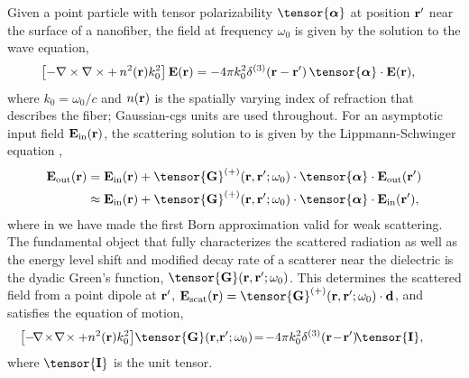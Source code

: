 \documentclass[aps,pra,twocolumn]{revtex4-1} %
\newcommand{\inp}{{\rm in}}
\newcommand{\out}{{\rm out}}
\newcommand{\unittens}{\tensor{\mathbf{I}}}
\begin{document}
Given a point particle with tensor polarizability $\tensor{\boldsymbol{\alpha}}$ at position $\mathbf{r}'$ near the surface of a nanofiber, the field  at frequency $\omega_0$ is given by the solution to the wave equation, 
	\begin{align}\label{Eq::WaveEquationSource}
		\left[ - \nabla\times\nabla\times + \, n^2(\br)k_0^2 \right] \mathbf{E}(\br) &= -4\pi  k_0^2 \delta^{(3)}(\br-\br')\,  \tensor{\boldsymbol{\alpha}}\cdot \mathbf{E}(\br),
	\end{align}
where $k_0=\omega_0/c$ and $n(\mathbf{r})$ is the spatially varying index of refraction that describes the fiber; Gaussian-cgs units are used throughout.  
For an asymptotic input field $\mathbf{E}_{\inp}(\br)$, the scattering solution to  is given by the Lippmann-Schwinger equation \cite{wubs_multiple-scattering_2004},
	\begin{align}
		\mathbf{E}_{\out}(\br) &=\mathbf{E}_{\inp}(\br)+\tensor{\mathbf{G}}^{(+)}(\br , \br'; \omega_0)\cdot 
\tensor{\boldsymbol{\alpha}}\cdot \mathbf{E}_{\out}(\br')\\
		&\approx \mathbf{E}_{\inp}(\br)+ \tensor{\mathbf{G}}^{(+)}(\br , \br'; \omega_0) \cdot 
\tensor{\boldsymbol{\alpha}}\cdot \mathbf{E}_{\inp}(\br'), \label{Eq::ScatteredField}
	\end{align}
where in  we have made the first Born approximation valid for weak scattering. The fundamental object that fully characterizes the scattered radiation as well as the energy level shift and modified decay rate of a scatterer near the dielectric is the dyadic Green's function, $\tensor{\mathbf{G}}(\br, \br';\omega_0)$. This determines the scattered field from a point dipole at $\mathbf{r}'$, $\mathbf{E}_{\rm scat}(\br)= \tensor{\mathbf{G}}^{(+)}(\br , \br'; \omega_0)\cdot \mathbf{d}$, and satisfies the equation of motion,
	\begin{align} \label{Eq::GreensDiffEq}
		\!\!\!\!\!\!\left[ -\!\nabla\!\times\!\nabla\!\times + n^2(\mbf{r}) k_0^2 \right]\! \tensor{\mathbf{G}}(\br,\! \br';\omega_0) &\!=\! -4\pi 
k_0^2 \delta^{(3)}(\mathbf{r}\!-\!\mathbf{r}')\! \unittens,
	\end{align}
where $\unittens$ is the unit tensor.   
\end{document}
